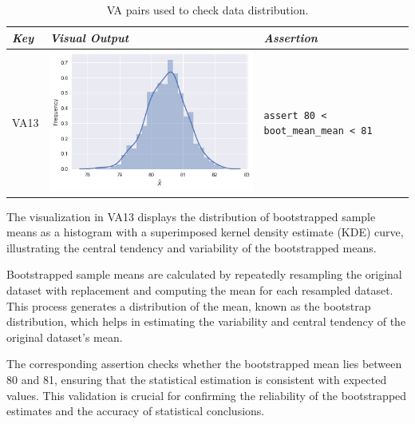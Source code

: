 \begin{table}
  \centering
  \caption{VA pairs used to check data distribution.}
  \begin{tabular}{@{} m{} m{} m{} @{}}
    \toprule
    \emph{\textbf{Key}}&
    \emph{\textbf{Visual Output}}&
    \emph{\textbf{Assertion}}\\
    \midrule

    VA13 &
    \includegraphics[width=\linewidth]{va13.png} &
    \lstinline[]$assert 80 < boot_mean_mean < 81$\\
    \bottomrule
  \end{tabular}
  \label{tab:va-dist-check}
\end{table}

The visualization in VA13 displays the distribution of bootstrapped sample means as a histogram with a superimposed kernel density estimate (KDE) curve, illustrating the central tendency and variability of the bootstrapped means.

Bootstrapped sample means are calculated by repeatedly resampling the original dataset with replacement and computing the mean for each resampled dataset. This process generates a distribution of the mean, known as the bootstrap distribution, which helps in estimating the variability and central tendency of the original dataset's mean.

The corresponding assertion checks whether the bootstrapped mean lies between 80 and 81, ensuring that the statistical estimation is consistent with expected values. This validation is crucial for confirming the reliability of the bootstrapped estimates and the accuracy of statistical conclusions.

